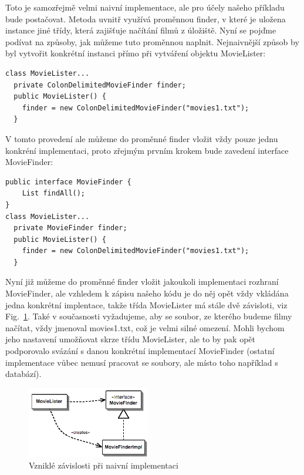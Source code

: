 \documentclass[a4paper,conference]{IEEEtran}
\newcommand{\fig}[1]{Fig.~\ref{fig:#1}}      %
\begin{document}
Toto je samozřejmě velmi naivní implementace, ale pro účely našeho příkladu bude postačovat. Metoda uvnitř využívá proměnnou finder, v které je uložena instance jiné třídy, která zajišťuje načítání filmů z úložiště. Nyní se pojďme podívat na způsoby, jak můžeme tuto proměnnou naplnit.
Nejnaivnější způsob by byl vytvořit konkrétní instanci přímo při vytváření objektu MovieLister:

\begin{lstlisting}
class MovieLister...
  private ColonDelimitedMovieFinder finder;
  public MovieLister() {
    finder = new ColonDelimitedMovieFinder("movies1.txt");
  }
\end{lstlisting}

V tomto provedení ale můžeme do proměnné finder vložit vždy pouze jednu konkréní implementaci, proto zřejmým prvním krokem bude zavedení interface MovieFinder: 

\lstset{language=Java, caption=Naplnění proměnné finder s využitím interface, label=listing:Java}
\begin{lstlisting}
public interface MovieFinder {
    List findAll();
}
class MovieLister...
  private MovieFinder finder;
  public MovieLister() {
    finder = new ColonDelimitedMovieFinder("movies1.txt");
  }
\end{lstlisting}

Nyní již můžeme do proměnné finder vložit jakoukoli implementaci rozhraní MovieFinder, ale vzhledem k zápisu našeho kódu je do něj opět vždy vkládána jedna konkrétní implentace, takže třída MovieLister má stále dvě závisloti, viz \fig{naive}. Také v současnosti vyžadujeme, aby se soubor, ze kterého budeme filmy načítat, vždy jmenoval movies1.txt, což je velmi silné omezení. Mohli bychom jeho nastavení umožňovat skrze třídu MovieLister, ale to by pak opět podporovalo svázání s danou konkrétní implementací MovieFinder (ostatní implementace vůbec nemusí pracovat se soubory, ale místo toho například s databází).


\begin{figure}[!b]
\centering
\includegraphics[width=2.1in]{1-Naive}
\caption{Vzniklé závislosti při naivní implementaci}
\label{fig:naive}
\end{figure}
\end{document}
